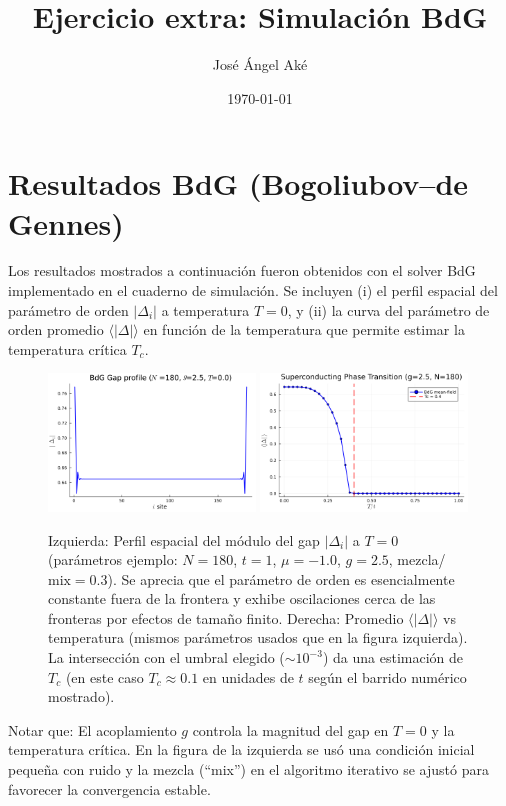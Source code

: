 \documentclass{homework}
\author{José Ángel Aké}
\date{\today}
\title{Ejercicio extra: Simulación BdG}
\begin{document}
  \maketitle


\section*{Resultados BdG (Bogoliubov--de Gennes)}
Los resultados mostrados a continuación fueron obtenidos con el solver BdG implementado en el cuaderno de simulación. Se incluyen (i) el perfil espacial del parámetro de orden $|\Delta_i|$ a temperatura $T=0$, y (ii) la curva del parámetro de orden promedio $\langle|\Delta|\rangle$ en función de la temperatura que permite estimar la temperatura crítica $T_c$.

\begin{figure}[H]
	\centering
	\includegraphics[width=0.49\textwidth]{../BdG_gap_profile.png}
	\includegraphics[width=0.49\textwidth]{../phase_transition.png}
	\caption{Izquierda: Perfil espacial del módulo del gap $|\Delta_i|$ a $T=0$ (parámetros ejemplo: $N=180$, $t=1$, $\mu=-1.0$, $g=2.5$, mezcla/ $\text{mix}=0.3$). Se aprecia que el parámetro de orden es esencialmente constante fuera de la frontera y exhibe oscilaciones cerca de las fronteras por efectos de tamaño finito. 
	Derecha: Promedio $\langle|\Delta|\rangle$ vs temperatura (mismos parámetros usados que en la figura izquierda). La intersección con el umbral elegido ($\sim10^{-3}$) da una estimación de $T_c$ (en este caso $T_c\approx0.1$ en unidades de $t$ según el barrido numérico mostrado).}
	\label{fig:bdg_results}
\end{figure}

Notar que: El acoplamiento $g$ controla la magnitud del gap en $T=0$ y la temperatura crítica. En la figura de la izquierda se usó una condición inicial pequeña con ruido y la mezcla (``mix'') en el algoritmo iterativo se ajustó para favorecer la convergencia estable.

%
%
\end{document}
